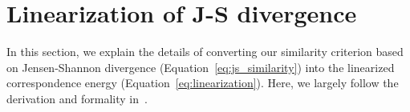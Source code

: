 \documentclass[preprint,review,12pt]{elsarticle}
\begin{document}
\section{Linearization of J-S divergence}
\label{apx:linearization}
In this section, we explain the details of converting our similarity criterion based on Jensen-Shannon divergence (Equation~\ref{eq:js_similarity}) into the linearized correspondence energy (Equation~\ref{eq:linearization}).
Here, we largely follow the derivation and formality in~\cite{Vercauteren2009S61}.

{\small 


}
\end{document}
